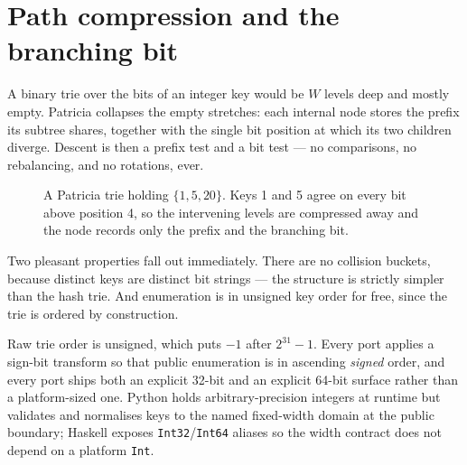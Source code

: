 \documentclass[11pt,twoside,openright]{book}
\newcommand{\code}[1]{\texorpdfstring{\textcolor{d7ink}{\texttt{#1}}}{#1}}
\begin{document}
\section{Path compression and the branching bit}

A binary trie over the bits of an integer key would be $W$ levels deep and
mostly empty. Patricia collapses the empty stretches: each internal node stores
the prefix its subtree shares, together with the single bit position at which
its two children diverge. Descent is then a prefix test and a bit test ---
no comparisons, no rebalancing, and no rotations, ever.

\begin{figure}[htbp]
\centering
{}
\caption{A Patricia trie holding $\{1, 5, 20\}$. Keys 1 and 5 agree on every bit
above position 4, so the intervening levels are compressed away and the node
records only the prefix and the branching bit.}
\label{fig:patricia}
\end{figure}

Two pleasant properties fall out immediately. There are no collision buckets,
because distinct keys are distinct bit strings --- the structure is strictly
simpler than the hash trie. And enumeration is in unsigned key order for free,
since the trie is ordered by construction.

\begin{contractbox}
Raw trie order is unsigned, which puts $-1$ after $2^{31}-1$. Every port applies
a sign-bit transform so that public enumeration is in ascending \emph{signed}
order, and every port ships both an explicit 32-bit and an explicit 64-bit
surface rather than a platform-sized one. Python holds arbitrary-precision
integers at runtime but validates and normalises keys to the named fixed-width
domain at the public boundary; Haskell exposes \code{Int32}/\code{Int64} aliases
so the width contract does not depend on a platform \code{Int}.
\end{contractbox}
\end{document}
